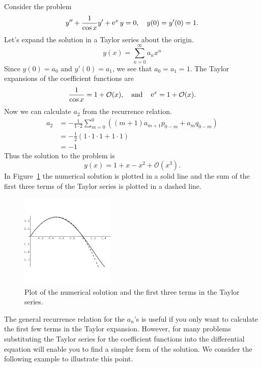 \begin{Example}
  Consider the problem
  \[ y'' + \frac{1}{\cos x} y' + \mathop{\mathrm{e}}\nolimits^x y = 0, \quad y(0) = y'(0) = 1. \]
  Let's expand the solution in a Taylor series about the origin.
  \[ y(x) = \sum_{n=0}^\infty a_n x^n \]
  Since $y(0) = a_0$ and $y'(0) = a_1$, we see that $a_0 = a_1 = 1.$
  The Taylor expansions of the coefficient functions are
  \[ \frac{1}{\cos x} = 1 + \mathcal{O}(x), \quad \mathrm{and} \quad \mathop{\mathrm{e}}\nolimits^x = 1 
  + \mathcal{O}(x). \]
  Now we can calculate $a_2$ from the recurrence relation.
  \begin{align*}
    a_2     &= -\frac{1}{1 \cdot 2} \sum_{m=0}^0 
    \left((m+1)a_{m+1}p_{0-m} + a_m q_{0-m} \right) \\
    &= -\frac{1}{2} (1\cdot 1 \cdot 1 + 1 \cdot 1) \\
    &= -1
  \end{align*}
  Thus the solution to the problem is
  \[ y(x) = 1 + x - x^2 + \mathcal{O}(x^3). \]
  In Figure~\ref{ndsftc} the numerical solution is plotted in a solid line
  and the sum of the first three terms of the Taylor series is plotted in a dashed line.

  \begin{figure}[tb!]
    \begin{center}
      \includegraphics[width=0.4\textwidth]{ode/series/ndsftc}
    \end{center}
    \caption{Plot of the numerical solution and the first three terms in the
      Taylor series.}
    \label{ndsftc}
  \end{figure}
\end{Example}











The general recurrence relation for the $a_n$'s is useful if you only want to
calculate the first few terms in the Taylor expansion.  However,
for many problems substituting the Taylor series for the 
coefficient functions into the differential equation will enable you to 
find a simpler form of the solution.
We consider the following example to illustrate this point.





